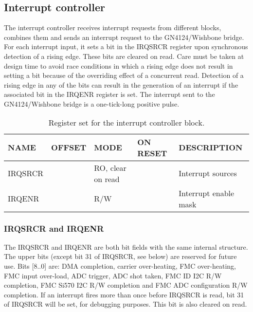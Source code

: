 \documentclass{article}
\begin{document}
\subsection{Interrupt controller}
The interrupt controller receives interrupt requests from different blocks, combines them and sends an interrupt request to the GN4124/Wishbone bridge. For each interrupt input, it sets a bit in the IRQSRCR register upon synchronous detection of a rising edge. These bits are cleared on read. Care must be taken at design time to avoid race conditions in which a rising edge does not result in setting a bit because of the overriding effect of a concurrent read. Detection of a rising edge in any of the bits can result in the generation of an interrupt if the associated bit in the IRQENR register is set. The interrupt sent to the GN4124/Wishbone bridge is a one-tick-long positive pulse.

\begin{table}[htbp]
  \centering
  \begin{tabularx}{\textwidth}{|l|r|X|l|l|}
    \hline
    \textbf{NAME} & \textbf{OFFSET} & \textbf{MODE} & \textbf{ON RESET} & \textbf{DESCRIPTION} \\
    \hline
    \hline
    IRQSRCR & & RO, clear on read & & Interrupt sources\\
    \hline
    IRQENR & & R/W & & Interrupt enable mask\\
    \hline
  \end{tabularx}
  \caption{Register set for the interrupt controller block.}
  \label{tab:irq_control}
\end{table}

\subsubsection{IRQSRCR and IRQENR}
The IRQSRCR and IRQENR are both bit fields with the same internal structure. The upper bits (except bit 31 of IRQSRCR, see below) are reserved for future use. Bits [8..0] are: DMA completion, carrier over-heating, FMC over-heating, FMC input over-load, ADC trigger, ADC shot taken, FMC ID I2C R/W completion, FMC Si570 I2C R/W completion and FMC ADC configuration R/W completion. If an interrupt fires more than once before IRQSRCR is read, bit 31 of IRQSRCR will be set, for debugging purposes. This bit is also cleared on read.   
\end{document}
